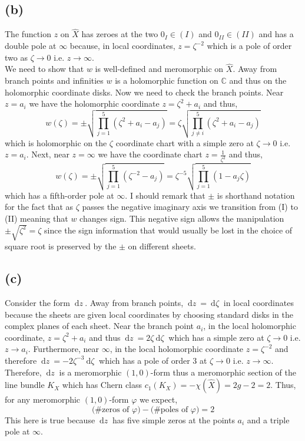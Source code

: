 \documentclass[12pt]{extarticle}
\newcommand{\C}{\mathbb{C}}
\renewcommand{\d}[1]{\: \mathrm{d}#1 \:}
\theoremstyle{definition}
\begin{document}
\subsection*{(b)}
The function $z$ on $\hat{X}$ has zeroes at the two $0_I \in (I)$ and $0_{II} \in (II)$ and has a double pole at $\infty$ because, in local coordinates, $z = \zeta^{-2}$ which is a pole of order two as $\zeta \to 0$ i.e. $z \to \infty$. 
\bigskip\\
We need to show that $w$ is well-defined and meromorphic on $\hat{X}$. Away from branch points and infinities $w$ is a holomorphic function on $\C$ and thus on the holomorphic coordinate disks. Now we need to check the branch points. Near $z = a_i$ we have the holomorphic coordinate $z = \zeta^2 + a_i$ and thus,
\[ w(\zeta) = \pm \sqrt{\prod_{j = 1}^5 (\zeta^2 + a_i - a_j)} = \zeta \sqrt{\prod_{j \neq i}^5 (\zeta^2 + a_i - a_j)} \]
which is holomorphic on the $\zeta$ coordinate chart with a simple zero at $\zeta \to 0$ i.e. $z = a_i$. Next, near $z = \infty$ we have the coordinate chart $z = \frac{1}{\zeta^2}$ and thus,
\[ w(\zeta) = \pm \sqrt{\prod_{j = 1}^5 (\zeta^{-2} - a_j)} = \zeta^{-5} \sqrt{\prod_{j = 1}^5 (1 - a_j \zeta)} \]
which has a fifth-order pole at $\infty$. I should remark that $\pm$ is shorthand notation for the fact that as $\zeta$ passes the negative imaginary axis we transition from (I) to (II) meaning that $w$ changes sign. This negative sign allows the manipulation $\pm \sqrt{\zeta^2} = \zeta$ since the sign information that would usually be lost in the choice of square root is preserved by the $\pm$ on different sheets.


\subsection*{(c)}

Consider the form $\d{z}$. Away from branch points, $\d{z} = \d{\zeta}$ in local coordinates because the sheets are given local coordinates by choosing standard disks in the complex planes of each sheet. Near the branch point $a_i$, in the local holomorphic coordinate, $z = \zeta^2 + a_i$ and thus $\d{z} = 2 \zeta \d{\zeta}$ which has a simple zero at $\zeta \to 0$ i.e. $z \to a_i$. Furthermore, near $\infty$, in the local holomorphic coordinate $z = \zeta^{-2}$ and therefore $\d{z} = - 2 \zeta^{-3} \d{\zeta}$ which has a pole of order 3 at $\zeta \to 0$ i.e. $z \to \infty$. 
\bigskip\\ 
Therefore, $\d{z}$ is a meromorphic $(1,0)$-form thus a meromorphic section of the line bundle $K_X$ which has Chern class $c_1(K_X) = - \chi(\hat{X}) = 2 g - 2 = 2$. Thus, for any meromorphic $(1,0)$-form $\varphi$ we expect,
\[ \text{(\# zeros of $\varphi$)} - \text{(\# poles of $\varphi$)} = 2 \]
This here is true because $\d{z}$ has five simple zeros at the points $a_i$ and a triple pole at $\infty$. 
\end{document}
